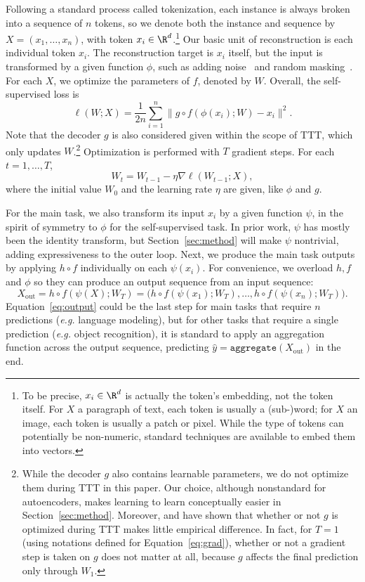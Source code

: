 \documentclass{article} %
\begin{document}
Following a standard process called tokenization, each instance is always broken into a sequence of $n$ tokens, so we denote both the instance and sequence by $X = (x_1, \dots, x_n)$, with token $x_i\in\R^d$.\footnote{
To be precise, $x_i\in\R^d$ is actually the token's embedding, not the token itself. 
For $X$ a paragraph of text, each token is usually a (sub-)word; for $X$ an image, each token is usually a patch or pixel.
While the type of tokens can potentially be non-numeric, standard techniques are available to embed them into vectors.
}
Our basic unit of reconstruction is each individual token $x_i$.
The reconstruction target is $x_i$ itself, but the input is transformed by a given function $\phi$, such as adding noise~\citep{denoisingautoencoder} and random masking~\citep{mae}.
For each $X$, we optimize the parameters of $f$, denoted by $W$.
Overall, the self-supervised loss is
\begin{equation}
\label{eq:smalll}
\ell(W; X) 
= \frac{1}{2n} \sum_{i=1}^n \big\| g \circ f\left(\phi(x_i); W\right) -  x_i \big\|^2.
\end{equation}
Note that the decoder $g$ is also considered given within the scope of TTT, which only updates $W$.\footnote{
While the decoder $g$ also contains learnable parameters, we do not optimize them during TTT in this paper.
Our choice, although nonstandard for autoencoders, makes learning to learn conceptually easier in Section~\ref{sec:method}. 
Moreover, \cite{sun2020test} and \cite{ttt-mae} have shown that whether or not $g$ is optimized during TTT makes little empirical difference.
In fact, for $T=1$ (using notations defined for Equation~\ref{eq:grad}), whether or not a gradient step is taken on $g$ does not matter at all, because $g$ affects the final prediction only through $W_1$.
}
Optimization is performed with $T$ gradient steps.
For each $t = 1,\dots, T$,
\begin{equation}
\label{eq:grad}
W_t = W_{t-1} - \eta \nabla \ell(W_{t-1} ; X),
\end{equation}
where the initial value $W_0$ and the learning rate $\eta$ are given, like $\phi$ and $g$.

For the main task, we also transform its input $x_i$ by a given function $\psi$, in the spirit of symmetry to $\phi$ for the self-supervised task.
In prior work, $\psi$ has mostly been the identity transform, but Section~\ref{sec:method} will make $\psi$ nontrivial, adding expressiveness to the outer loop.
Next, we produce the main task outputs by applying $h\circ f$ individually on each $\psi(x_i)$.
For convenience, we overload $h, f$ and $\phi$ so they can produce an output sequence from an input sequence:
\begin{equation}
\label{eq:output}
X_\text{out} = h\circ f\left(\psi(X); W_T\right) 
= \bigg( h\circ f\left(\psi(x_1); W_T\right), \dots, h\circ f\left(\psi(x_n); W_T\right) \bigg).
\end{equation}
Equation~\ref{eq:output} could be the last step for main tasks that require $n$ predictions (\textit{e.g.} language modeling), but for other tasks that require a single prediction (\textit{e.g.} object recognition), 
it is standard to apply an aggregation function across the output sequence, predicting $\hat y = \texttt{aggregate}(X_\text{out})$ in the end.
\end{document}

